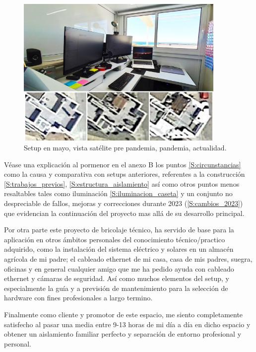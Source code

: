 \begin{figure}[htb]
\begin{center}
\includegraphics[width=0.9\textwidth]{./figuras/setup_mayo}
\caption{Setup en mayo, vista satélite pre pandemia, pandemia, actualidad.}
\label{F:setup_mayo}
\end{center}
\end{figure}

Véase una explicación al pormenor en el anexo B los puntos \ref{S:circunstancias} como la causa y comparativa con setups anteriores,  referentes a la construcción \ref{S:trabajos_previos}, \ref{S:estructura_aislamiento} así como otros puntos menos resaltables tales como iluminación \ref{S:iluminacion_caseta} y un conjunto no despreciable de fallos, mejoras y correcciones durante 2023 (\ref{S:cambios_2023}) que evidencian la continuación del proyecto mas allá de su desarrollo principal.

Por otra parte este proyecto de bricolaje técnico, ha servido de base para la aplicación en otros ámbitos personales del conocimiento técnico/practico adquirido, como la instalación del sistema eléctrico y solares en un almacén agrícola de mi padre; el cableado ethernet de mi casa, casa de mis padres, suegra, oficinas y en general cualquier amigo que me ha pedido ayuda con cableado ethernet y cámaras de seguridad. Así como muchos elementos del setup, y especialmente la guía\cite{c_guia_hardware} y a previsión de mantenimiento para la selección de hardware con fines profesionales a largo termino.

Finalmente como cliente y promotor de este espacio, me siento completamente satisfecho al pasar una media entre 9-13 horas de mi día a día en dicho espacio y obtener un aislamiento familiar perfecto y separación de entorno profesional y personal.
